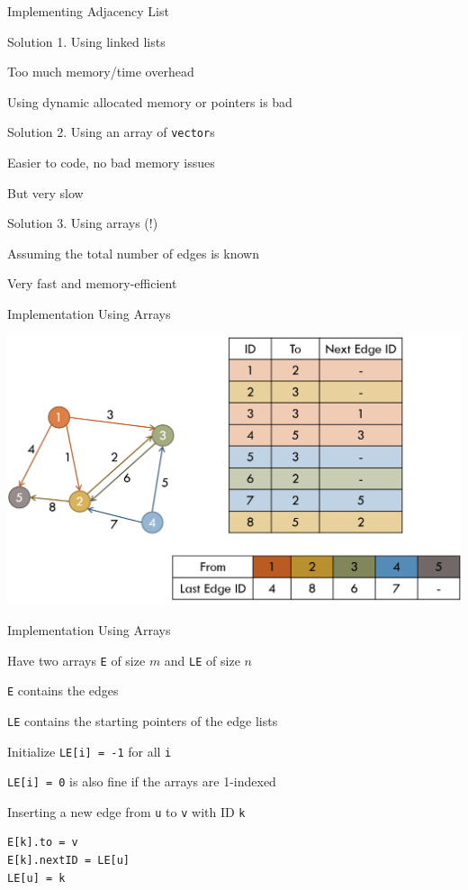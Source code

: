 \documentclass[13pt,onlymath]{beamer}
\begin{document}
\begin{frame}[fragile]{Implementing Adjacency List}
\BIT
\item Solution 1. Using linked lists
\BIT
\item Too much memory/time overhead
\item Using dynamic allocated memory or pointers is bad
\EIT
\item Solution 2. Using an array of \verb.vector.s
\BIT
\item Easier to code, no bad memory issues
\item But very slow
\EIT
\item Solution 3. Using arrays (!)
\BIT
\item Assuming the total number of edges is known
\item Very fast and memory-efficient
\EIT
\EIT
\end{frame}

\begin{frame}{Implementation Using Arrays}
\begin{center}
\includegraphics[height=0.7\textheight]{figures/adjlist2}
\end{center}
\end{frame}

\begin{frame}[fragile]{Implementation Using Arrays}
\BIT
\item Have two arrays \verb,E, of size $m$ and \verb,LE, of size $n$
\BIT
\item \verb,E, contains the edges
\item \verb,LE, contains the starting pointers of the edge lists
\EIT
\item Initialize \verb,LE[i] = -1, for all \verb,i,
\BIT
\item \verb,LE[i] = 0, is also fine if the arrays are 1-indexed
\EIT
\item Inserting a new edge from \verb,u, to \verb,v, with ID \verb,k,
\begin{Verbatim}[xleftmargin=15pt]
E[k].to = v
E[k].nextID = LE[u]
LE[u] = k
\end{Verbatim}
\EIT
\end{frame}
\end{document}
